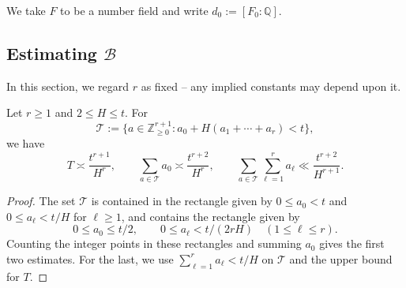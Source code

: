 \documentclass[reqno]{amsart} 
\begin{document}
We take $F$ to be a number field and write $d_0 := [F_0 : \mathbb{Q}]$.

\subsection{Estimating $\mathcal{B}$}\label{sec:cus71nhgnt}

In this section, we regard $r$ as fixed -- any implied constants may depend upon it.


\begin{lemma}\label{lemma:weighted-monomial-estimates}
  Let $r \geq 1$ and $2 \leq H \leq t$.  For
  \begin{equation*}
    \mathcal{T} := \{a \in \mathbb{Z}_{\geq 0}^{r+1} : a_0 + H(a_1 + \dotsb + a_r) < t\},
  \end{equation*}
  we have
  \begin{equation}\label{eq:cus637ip5d}
    T \asymp \frac{t^{r+1}}{H^r},\qquad
    \sum_{a \in \mathcal{T}} a_0 \asymp \frac{t^{r+2}}{H^r},\qquad
    \sum_{a \in \mathcal{T}}\sum_{\ell=1}^r a_\ell
    \ll \frac{t^{r+2}}{H^{r+1}}.
  \end{equation}
\end{lemma}
\begin{proof}
  The set $\mathcal{T}$ is contained in the rectangle given by $0 \leq a_0 < t$ and $0 \leq a_\ell < t/H$ for $\ell \geq 1$, and contains the rectangle given by
  \begin{equation*}
    0 \leq a_0 \leq t/2,\qquad
    0 \leq a_\ell < t/(2rH)\quad (1 \leq \ell \leq r).
  \end{equation*}
  Counting the integer points in these rectangles and summing $a_0$ gives the first two estimates.  For the last, we use $\sum_{\ell=1}^r a_\ell < t/H$ on $\mathcal{T}$ and the upper bound for $T$.
\end{proof}
\end{document}
